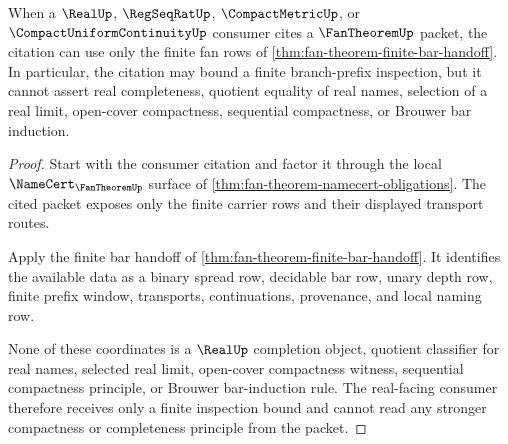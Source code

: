 \begin{theorem}
\label{thm:fan-theorem-real-completion-boundary}
When a $\RealUp$, $\RegSeqRatUp$, $\CompactMetricUp$, or $\CompactUniformContinuityUp$ consumer cites a $\FanTheoremUp$ packet, the citation can use only the finite fan rows of \autoref{thm:fan-theorem-finite-bar-handoff}. In particular, the citation may bound a finite branch-prefix inspection, but it cannot assert real completeness, quotient equality of real names, selection of a real limit, open-cover compactness, sequential compactness, or Brouwer bar induction.
\end{theorem}
\begin{proof}
Start with the consumer citation and factor it through the local $\NameCert_{\FanTheoremUp}$ surface of \autoref{thm:fan-theorem-namecert-obligations}. The cited packet exposes only the finite carrier rows and their displayed transport routes.

Apply the finite bar handoff of \autoref{thm:fan-theorem-finite-bar-handoff}. It identifies the available data as a binary spread row, decidable bar row, unary depth row, finite prefix window, transports, continuations, provenance, and local naming row.

None of these coordinates is a $\RealUp$ completion object, quotient classifier for real names, selected real limit, open-cover compactness witness, sequential compactness principle, or Brouwer bar-induction rule. The real-facing consumer therefore receives only a finite inspection bound and cannot read any stronger compactness or completeness principle from the packet.
\end{proof}

